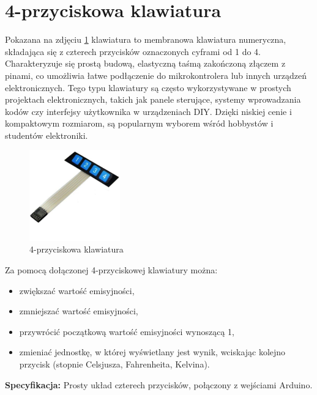 \vspace{12pt}

\section{4-przyciskowa klawiatura}

Pokazana na zdjęciu \ref{fig:klaw}  klawiatura to membranowa klawiatura numeryczna, składająca się z czterech przycisków oznaczonych cyframi od 1 do 4. Charakteryzuje się prostą budową, elastyczną taśmą zakończoną złączem z pinami, co umożliwia łatwe podłączenie do mikrokontrolera lub innych urządzeń elektronicznych. Tego typu klawiatury są często wykorzystywane w prostych projektach elektronicznych, takich jak panele sterujące, systemy wprowadzania kodów czy interfejsy użytkownika w urządzeniach DIY. Dzięki niskiej cenie i kompaktowym rozmiarom, są popularnym wyborem wśród hobbystów i studentów elektroniki.

\begin{figure}[h!]
        \centering
        \includegraphics[width=0.35\textwidth]{images/keyboard4pin.jpg}
        \caption{4-przyciskowa klawiatura \cite{8}}
        \label{fig:klaw}
    \end{figure}

Za pomocą dołączonej 4-przyciskowej klawiatury można:
\begin{itemize}
    \item zwiększać wartość emisyjności,
    \item zmniejszać wartość emisyjności,
    \item przywrócić początkową wartość emisyjności wynoszącą 1,
    \item zmieniać jednostkę, w której wyświetlany jest wynik, wciskając kolejno przycisk (stopnie Celsjusza, Fahrenheita, Kelvina).
\end{itemize}

\textbf{Specyfikacja:} Prosty układ czterech przycisków, połączony z wejściami Arduino.

\vspace{12pt}

